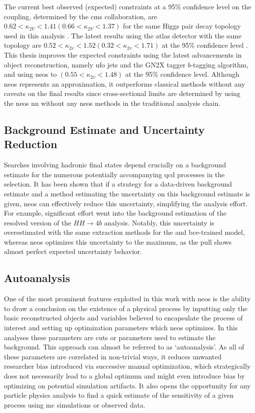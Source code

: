 The current best observed (expected) constraints at a 95\% confidence level on the \ktwov coupling, determined by the \ac{cms} collaboration, are $0.62 < \kappa_{2V} < 1.41 (0.66 < \kappa_{2V}< 1.37)$ for the same Higgs pair decay topology used in this analysis \citep{PhysRevLett.131.041803}. The latest results using the \ac{atlas} detector with the same topology are $0.52 < \kappa_{2v}< 1.52 (0.32 < \kappa_{2v}< 1.71)$ at the 95\% confidence level \citep{atlascollaboration2024searchpairproductionboosted}. This thesis improves the expected constraints using the latest advancements in object reconstruction, namely \ac{ufo} jets and the GN2X tagger $b$-tagging algorithm, and using \ac{neos} to $(0.55 < \kappa_{2v}< 1.48)$ at the 95\% confidence level. Although \ac{neos} represents an approximation, it outperforms classical methods without any caveats on the final results since cross-sectional limits are determined by using the \ac{neos} \ac{nn} without any \ac{neos} methods in the traditional analysis chain.


\subsection{Background Estimate and Uncertainty Reduction}
Searches involving hadronic final states depend crucially on a background estimate for the numerous potentially accompanying \ac{qcd} processes in the selection. It has been shown that if a strategy for a data-driven background estimate and a method estimating the uncertainty on this background estimate is given, \ac{neos} can effectively reduce this uncertainty, simplifying the analysis effort. For example, significant effort went into the background estimation of the resolved version of the $HH\rightarrow 4b$ analysis. Notably, this uncertainty is overestimated with the same extraction methods for the \mhh and \ac{bce}-trained model, whereas \ac{neos} optimizes this uncertainty to the maximum, as the pull shows almost perfect expected uncertainty behavior.

\subsection{Autoanalysis}
One of the most prominent features exploited in this work with \ac{neos} is the ability to draw a conclusion on the existence of a physical process by inputting only the basic reconstructed objects and variables believed to encapsulate the process of interest and setting up optimization parameters which \ac{neos} optimizes. In this analyses these parameters are cuts or parameters used to estimate the background. This approach can almost be referred to as `autoanalysis'. As all of these parameters are correlated in non-trivial ways, it reduces unwanted researcher bias introduced via successive manual optimization, which strategically does not necessarily lead to a global optimum and might even introduce bias by optimizing on potential simulation artifacts. It also opens the opportunity for any particle physics analysis to find a quick estimate of the sensitivity of a given process using \ac{mc} simulations or observed data.


